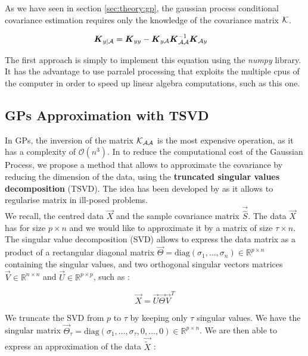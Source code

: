 As we have seen in section \ref{sec:theory:gp}, the gaussian process conditional covariance estimation requires only the knowledge of the covariance matrix $\mathcal{K}$. 

\begin{align}
	{\boldsymbol{{K}}}_{y | \mathcal{A}} &=  {\boldsymbol{{K}}}_{yy} - {\boldsymbol{{K}}}_{y\mathcal{A}} {\boldsymbol{{K}}}_{\mathcal{A}\mathcal{A}}^{-1} {\boldsymbol{{K}}}_{\mathcal{A} y} 
\end{align}

The first approach is simply to implement this equation using the \textit{numpy} library. It has the advantage to use parralel processing that exploits the multiple cpus of the computer in order to speed up linear algebra computations, such as this one. 

\subsection{GPs Approximation with TSVD}

In GPs, the inversion of the matrix $\mathcal{K}_{\mathcal{A}\mathcal{A}}$ is the most expensive operation, as it has a complexity of $\mathcal{O}(n^3)$. In to reduce the computational cost of the Gaussian Process, we propose a method that allows to approximate the covariance by reducing the dimension of the data, using the \textbf{truncated singular values decomposition} (TSVD). The idea has been developed by \citep{hansen_truncatedsvd_1987} as it allows to regularise matrix in ill-posed problems.  \\

We recall, the centred data $\vec{X}$ and the sample covariance matrix $\vec{\hat{S}}$. The data $\vec{X}$ has for size $p\times n$ and we would like to approximate it by a matrix of size $\tau \times n $. The singular value decomposition (SVD) allows to express the data matrix as a product of a rectangular diagonal matrix $\vec{\Theta} = \text{diag}(\sigma_1, \dots, \sigma_n ) \in \mathbb{R}^{p \times n} $ containing the singular values, and two orthogonal singular vectors matrices $\vec{V} \in \mathbb{R}^{n \times n} $ and $\vec{U} \in \mathbb{R}^{p \times p} $, such as : 

\begin{equation}
	\vec{X} = \vec{U} \vec{\Theta} \vec{V}^T
\end{equation}

We truncate the SVD from $p$ to $\tau$ by keeping only $\tau$ singular values. We have the singular matrix $\vec{\Theta}_\tau = \text{diag}(\sigma_1, \dots, \sigma_\tau, 0, \dots, 0 ) \in \mathbb{R}^{p \times n} $. We are then able to express an approximation of the data $\vec{\tilde{X}}$ : 


